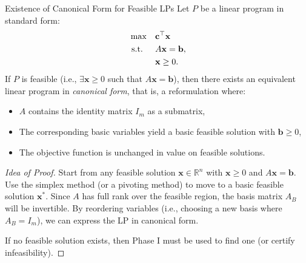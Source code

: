\begin{proposition}{Existence of Canonical Form for Feasible LPs}\label{prop:canonical-exists}
Let \( P \) be a linear program in standard form:
\[
\begin{aligned}
\max \quad & \mathbf{c}^\top \mathbf{x} \\
\mbox{ s.t. } \quad & A\mathbf{x} = \mathbf{b}, \\
& \mathbf{x} \geq 0.
\end{aligned}
\]
If \( P \) is feasible (i.e., \( \exists \mathbf{x} \geq 0 \) such that \( A\mathbf{x} = \mathbf{b} \)), then there exists an equivalent linear program in \emph{canonical form}, that is, a reformulation where:
\begin{itemize}
    \item \( A \) contains the identity matrix \( I_m \) as a submatrix,
    \item The corresponding basic variables yield a basic feasible solution with \( \mathbf{b} \geq 0 \),
    \item The objective function is unchanged in value on feasible solutions.
\end{itemize}
\end{proposition}

\begin{proof}[Idea of Proof]
Start from any feasible solution \( \mathbf{x} \in \mathbb{R}^n \) with \( \mathbf{x} \geq 0 \) and \( A\mathbf{x} = \mathbf{b} \).  
Use the simplex method (or a pivoting method) to move to a basic feasible solution \( \mathbf{x}^* \).  
Since \( A \) has full rank over the feasible region, the basis matrix \( A_B \) will be invertible.  
By reordering variables (i.e., choosing a new basis where \( A_B = I_m \)), we can express the LP in canonical form.

If no feasible solution exists, then Phase I must be used to find one (or certify infeasibility).
\end{proof}

